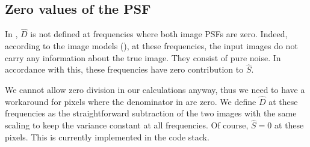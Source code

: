 \subsection{Zero values of the PSF\label{sec:PSFzero}}
%
\par In , \(\hat{D}\) is not defined at frequencies where both
image PSFs are zero. Indeed, according to the image models (), at
these frequencies, the input images do not carry any information about the
true image. They consist of pure noise. In accordance with this, these
frequencies have zero contribution to \(\hat{S}\).
%
\par We cannot allow zero division in our calculations anyway, thus we
need to have a workaround for pixels where the denominator in
 are zero. We define \(\hat{D}\) at these
frequencies as the straightforward subtraction of the two images with
the same scaling to keep the variance constant at all
frequencies. Of course, \(\hat{S}=0\) at these pixels. This is
currently implemented in the code stack.
%
